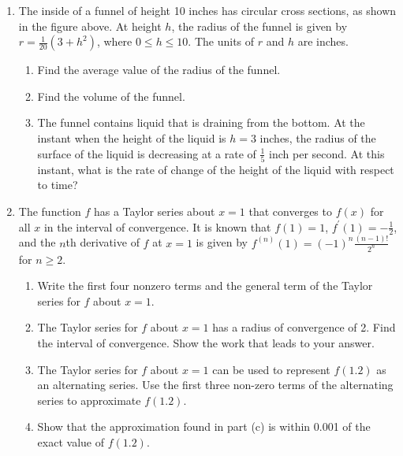 \begin{enumerate}
	\item The inside of a funnel of height 10 inches has circular cross sections, as shown in the figure above.
		At height $h$, the radius of the funnel is given by $r = \frac{1}{20}\left(3+h^2\right)$, where $0 \leq h \leq 10$.
		The units of $r$ and $h$ are inches.
		\begin{enumerate}
			\item Find the average value of the radius of the funnel.
			\item Find the volume of the funnel.
			\item The funnel contains liquid that is draining from the bottom.
				At the instant when the height of the liquid is $h=3$ inches, the radius of the surface of the liquid is decreasing at a rate of $\frac{1}{5}$ inch per second.
				At this instant, what is the rate of change of the height of the liquid with respect to time?
		\end{enumerate}
	
	\item The function $f$ has a Taylor series about $x=1$ that converges to $f(x)$ for all $x$ in the interval of convergence.
		It is known that $f(1)=1$, $f^\prime(1)=-\frac{1}{2}$, and the $n$th derivative of $f$ at $x=1$ is given by $f^{(n)}(1) = (-1)^{n}\frac{(n-1)!}{2^n}$ for $n \geq 2$.
		\begin{enumerate}
			\item Write the first four nonzero terms and the general term of the Taylor series for $f$ about $x=1$.
			\item The Taylor series for $f$ about $x=1$ has a radius of convergence of 2.
				Find the interval of convergence.
				Show the work that leads to your answer.
			\item The Taylor series for $f$ about $x=1$ can be used to represent $f(1.2)$ as an alternating series.
				Use the first three non-zero terms of the alternating series to approximate $f(1.2)$.
			\item Show that the approximation found in part (c) is within 0.001 of the exact value of $f(1.2)$.
		\end{enumerate}
\end{enumerate}